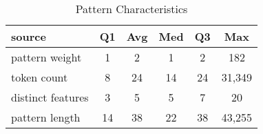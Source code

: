 \begin{table}[tb]
\begin{center}
\caption{Pattern Characteristics}
\label{table:patternStats}

\begin{tabular}{l|ccccc}
\toprule
source & Q1 & Avg & Med & Q3 & Max \\
\midrule
pattern weight & 1 & 2 & 1 & 2 & 182 \\
\midrule
token count & 8 & 24 & 14 & 24 & 31,349 \\
\midrule
distinct features & 3 & 5 & 5 & 7 & 20 \\
\midrule
pattern length & 14 & 38 & 22 & 38 & 43,255 \\
\bottomrule
\end{tabular}
\end{center}
\end{table}
